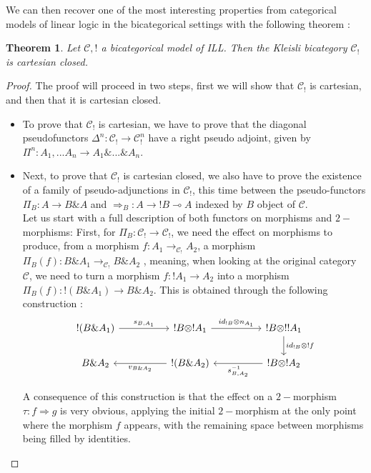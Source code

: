 \documentclass[a4paper, 12pt, twoside,openright]{report}
\newtheorem{theorem}{Theorem}
\begin{document}
We can then recover one of the most interesting properties from categorical models of linear logic in the bicategorical settings with the following theorem :
\begin{theorem}
Let $\mathcal{C},!$ a bicategorical model of ILL. Then the Kleisli bicategory $\mathcal{C}_!$ is cartesian closed.
\end{theorem}
\begin{proof}
The proof will proceed in two steps, first we will show that $\mathcal{C}_!$ is cartesian, and then that it is cartesian closed.
\begin{itemize}
\item To prove that $\mathcal{C}_!$ is cartesian, we have to prove that the diagonal pseudofunctors $\Delta^n : \mathcal{C}_!  \rightarrow \mathcal{C}^{n}_!$  have a right pseudo adjoint, given by $\Pi^n : A_1,...A_n \rightarrow A_1 \& ... \& A_n$. 
\item Next, to prove that $\mathcal{C}_!$ is cartesian closed, we also have to prove the existence of a family of  pseudo-adjunctions in $\mathcal{C}_!$, this time between the pseudo-functors   $\Pi_B : A \rightarrow B \& A$ and $ \Rightarrow_B: A \rightarrow !B \multimap A$  indexed by $B$ object of $\mathcal{C}$.\\

Let us start with a full description of both functors on morphisms and $2-$morphisms: 
First, for $\Pi_B : \mathcal{C}_! \rightarrow \mathcal{C}_!$, we need the effect on morphisms to produce, from a morphism $f: A_1 \rightarrow_{\mathcal{C}_!} A_2$, a morphism $\Pi_B(f) :B \& A_1 \rightarrow_{\mathcal{C}_!} B \& A_2$ , meaning, when looking at the original category $\mathcal{C}$, we need to turn a morphism $f: !A_1 \rightarrow A_2$ into a morphism $\Pi_B(f) :!(B \& A_1) \rightarrow B \& A_2$. This is obtained through the following construction : 
$$\begin{tikzcd}
!(B \& A_1)
\arrow{rr}{s_{B,A_1}}
&&
!B \otimes !A_1
\arrow{rr}{id_{!B} \otimes n_{A_1}}
&&
!B \otimes !!A_1
\arrow{d}{id_{!B} \otimes !f}
\\
B \& A_2
&&
!(B \& A_2)
\arrow{ll}{v_{B \& A_2}}
&&
!B \otimes !A_2
\arrow{ll}{s^{-1}_{B,A_2}}
\end{tikzcd}$$

A consequence of this construction is that the effect on a $2-$morphism $\tau: f \Rightarrow g$ is very obvious, applying the initial $2-$morphism at the only point where the morphism $f$ appears, with the remaining space between morphisms being filled by identities.\\


\end{itemize}
\end{proof}
\end{document}
